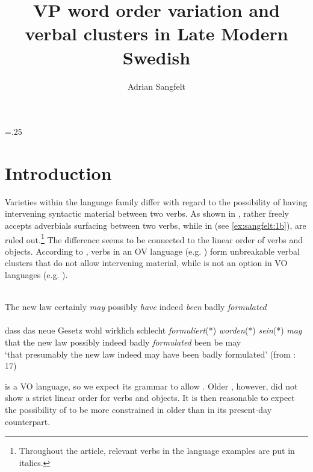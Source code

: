 \documentclass[output=paper, colorlinks, citecolor=brown]{langscibook}
\author{Adrian Sangfelt\orcid{}\affiliation{Uppsala University}}
\title{VP word order variation and verbal clusters in Late Modern Swedish}
\begin{document}
\multicolsep=.25\baselineskip
\maketitle 


\section{Introduction}\label{sec:sangfelt:1}

Varieties within the  language family differ with regard to the possibility of having intervening syntactic material between two verbs. As shown in ,  rather freely accepts adverbials surfacing between two verbs, while in  (see \ref{ex:sangfelt:1b}),  are ruled out.\footnote{Throughout the article, relevant verbs in the language examples are put in italics.} The difference seems to be connected to the linear order of verbs and objects. According to \citet[17–19, 33–35, 287–293]{Haider2010}, verbs in an OV language (e.g. ) form unbreakable verbal clusters that do not allow intervening material, while  is not an option in VO languages (e.g. ).

\ea
\label{ex:sangfelt:1}
\ea {}\label{ex:sangfelt:1a}\\
The new law {certainly} \textit{may} {possibly} \textit{have} {indeed} \textit{been} {badly} \textit{formulated} \\
\ex {}\label{ex:sangfelt:1b}\\
\gll dass das neue Gesetz {wohl} {wirklich} {schlecht} \textit{formuliert}(*) \textit{worden}(*) \textit{sein}(*) \textit{mag} \\
that the new law possibly indeed badly \textit{formulated} been be may \\
\glt ‘that presumably the new law indeed may have been badly formulated’ (from \citealt{Haider2010}: 17)
\z
\z 


 is a VO language, so we expect its grammar to allow . Older , however, did not show a strict linear order for verbs and objects. It is then reasonable to expect the possibility of  to be more constrained in older  than in its present-day counterpart.
\end{document}
